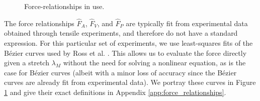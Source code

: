 \documentclass{sfuthesis}
\numberwithin{equation}{chapter}
\numberwithin{figure}{chapter}
\numberwithin{table}{chapter}
\theoremstyle{definition}
\begin{document}
\begin{figure}
    \centering
    \caption{Force-relationships in use.}
    \label{fig:force_curves_1D}
\end{figure}

The force relationships $\widehat{F}_A$, $\widehat{F}_V$, and $\widehat{F}_P$ are typically fit from experimental data obtained through tensile experiments, and therefore do not have a standard expression. For this particular set of experiments, we use least-squares fits of the B\'{e}zier curves used by Ross et al. \cite{RossWakeling2016Multibody}. This allows us to evaluate the force directly given a stretch $\lambda_M$ without the need for solving a nonlinear equation, as is the case for B\'{e}zier curves (albeit with a minor loss of accuracy since the B\'{e}zier curves are already fit from experimental data). 
We portray these curves in Figure \ref{fig:force_curves_1D} and give their exact definitions in Appendix \ref{app:force_relationships}.
\end{document}
